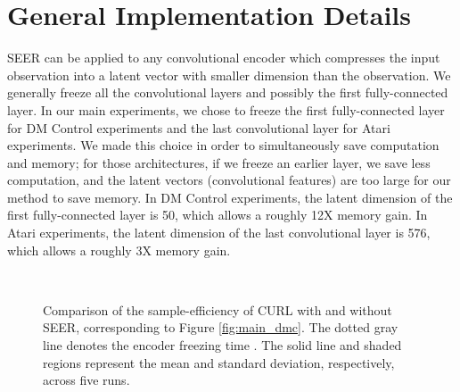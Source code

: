 \documentclass{article}
\begin{document}
\section{General Implementation Details} \label{appendix:freezing_details}
SEER can be applied to any convolutional encoder which compresses the input observation into a latent vector with smaller dimension than the observation. We generally freeze all the convolutional layers and possibly the first fully-connected layer. In our main experiments, we chose to freeze the first fully-connected layer for DM Control experiments and the last convolutional layer for Atari experiments. We made this choice in order to simultaneously save computation and memory; for those architectures, if we freeze an earlier layer, we save less computation, and the latent vectors (convolutional features) are too large for our method to save memory. In DM Control experiments, the latent dimension of the first fully-connected layer is 50, which allows a roughly 12X memory gain. In Atari experiments, the latent dimension of the last convolutional layer is 576, which allows a roughly 3X memory gain.

\begin{figure*} [t] \centering
{} 
\\
\caption{Comparison of the sample-efficiency of CURL with and without SEER, corresponding to Figure \ref{fig:main_dmc}. The dotted gray line denotes the encoder freezing time . The solid line and shaded regions represent the mean and standard deviation, respectively, across five runs.} \label{fig:main_samples_dmc}
\end{figure*}
\end{document}
